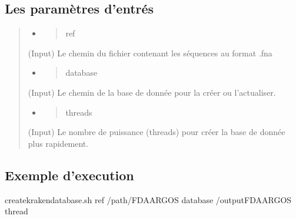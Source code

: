 \documentclass[letterpaper,10pt,french]{sphinxmanual}
\begin{document}
\subsection{Les paramètres d’entrés}
\label{\detokenize{bash/create_kraken_database.sh:les-parametres-d-entres}}\begin{quote}
\begin{itemize}
\item {} \begin{quote}\begin{description}
\item[{\sphinxhyphen{}ref}] \leavevmode
\end{description}\end{quote}

\end{itemize}

(Input) Le chemin du fichier contenant les séquences au format .fna
\begin{itemize}
\item {} \begin{quote}\begin{description}
\item[{\sphinxhyphen{}database}] \leavevmode
\end{description}\end{quote}

\end{itemize}

(Input) Le chemin de la base de donnée pour la créer ou l’actualiser.
\begin{itemize}
\item {} \begin{quote}\begin{description}
\item[{\sphinxhyphen{}threads}] \leavevmode
\end{description}\end{quote}

\end{itemize}

(Input) Le nombre de puissance (threads) pour créer la base de donnée plus rapidement.
\end{quote}


\subsection{Exemple d’execution}
\label{\detokenize{bash/create_kraken_database.sh:exemple-d-execution}}
\begin{sphinxVerbatim}[commandchars=\\\{\}]
create\PYGZus{}kraken\PYGZus{}database.sh \PYGZhy{}ref /path/FDA\PYGZus{}ARGOS \PYGZhy{}database /output\PYGZus{}FDA\PYGZus{}ARGOS \PYGZhy{}thread 
\end{sphinxVerbatim}
\end{document}
